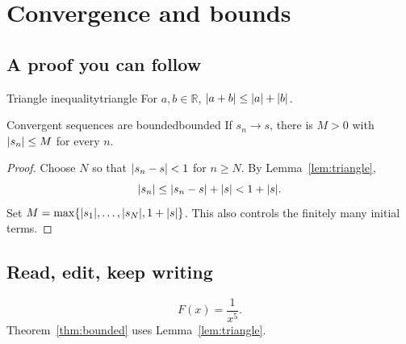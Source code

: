\chapter{Convergence and bounds}
\section{A proof you can follow}
\begin{lemma}{Triangle inequality}{triangle}
For $a,b\in\mathbb{R}$, $\lvert a+b\rvert\leq\lvert a\rvert+\lvert b\rvert$.
\end{lemma}
\begin{theorem}{Convergent sequences are bounded}{bounded}
If $s_n\to s$, there is $M>0$ with $\lvert s_n\rvert\leq M$ for every $n$.
\end{theorem}
\begin{proof}
Choose $N$ so that $\lvert s_n-s\rvert<1$ for $n\geq N$.
By Lemma~\ref{lem:triangle},
\begin{equation}\label{eq:estimate}
 \lvert s_n\rvert\leq\lvert s_n-s\rvert+\lvert s\rvert<1+\lvert s\rvert.
\end{equation}
Set $M=\max\{\lvert s_1\rvert,\ldots,\lvert s_N\rvert,1+\lvert s\rvert\}$.
This also controls the finitely many initial terms.
\end{proof}
\section{Read, edit, keep writing}
\begin{equation}\label{eq:model}
 F(x)=\frac{1}{x^{5}}.
\end{equation}
Theorem~\ref{thm:bounded} uses Lemma~\ref{lem:triangle}.
